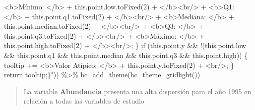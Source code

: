 \documentclass[
  10pt,
  letterpaper,
  DIV=11,
  numbers=noendperiod]{scrreprt}
\newenvironment{Shaded}{\begin{snugshade}}{\end{snugshade}}
\newcommand{\FunctionTok}[1]{\textcolor[rgb]{0.28,0.35,0.67}{#1}}
\newcommand{\NormalTok}[1]{\textcolor[rgb]{0.00,0.23,0.31}{#1}}
\newcommand{\SpecialCharTok}[1]{\textcolor[rgb]{0.37,0.37,0.37}{#1}}
\newcommand{\StringTok}[1]{\textcolor[rgb]{0.13,0.47,0.30}{#1}}
\begin{document}
\begin{Shaded}
\begin{Highlighting}[numbers=left,,]
\StringTok{                   \textquotesingle{}\textless{}b\textgreater{}Mínimo: \textless{}/b\textgreater{}\textquotesingle{} + this.point.low.toFixed(2) + \textquotesingle{}\textless{}/b\textgreater{}\textless{}br/\textgreater{}\textquotesingle{} +}
\StringTok{                   \textquotesingle{}\textless{}b\textgreater{}Q1: \textless{}/b\textgreater{}\textquotesingle{} + this.point.q1.toFixed(2) + \textquotesingle{}\textless{}/b\textgreater{}\textless{}br/\textgreater{}\textquotesingle{} +}
\StringTok{                   \textquotesingle{}\textless{}b\textgreater{}Mediana: \textless{}/b\textgreater{}\textquotesingle{} + this.point.median.toFixed(2) + \textquotesingle{}\textless{}/b\textgreater{}\textless{}br/\textgreater{}\textquotesingle{} +}
\StringTok{                   \textquotesingle{}\textless{}b\textgreater{}Q3: \textless{}/b\textgreater{}\textquotesingle{} + this.point.q3.toFixed(2) + \textquotesingle{}\textless{}/b\textgreater{}\textless{}br/\textgreater{}\textquotesingle{} +}
\StringTok{                   \textquotesingle{}\textless{}b\textgreater{}Máximo: \textless{}/b\textgreater{}\textquotesingle{} + this.point.high.toFixed(2) + \textquotesingle{}\textless{}/b\textgreater{}\textless{}br/\textgreater{}\textquotesingle{};}
\StringTok{    \}}
\StringTok{    if (this.point.y \&\& !(this.point.low \&\& this.point.q1 \&\& this.point.median \&\& this.point.q3 \&\& this.point.high)) \{ }
\StringTok{        tooltip += \textquotesingle{}\textless{}b\textgreater{}Valor Atípico: \textless{}/b\textgreater{}\textquotesingle{} + this.point.y.toFixed(2) + \textquotesingle{}\textless{}br/\textgreater{}\textquotesingle{};}
\StringTok{    \}}
\StringTok{    return tooltip;\}"}\NormalTok{)) }\SpecialCharTok{\%\textgreater{}\%} 
    \FunctionTok{hc\_add\_theme}\NormalTok{(}\FunctionTok{hc\_theme\_gridlight}\NormalTok{())}
\end{Highlighting}
\end{Shaded}

\begin{quote}
La variable \textbf{Abundancia} presenta una alta dispersión para el año
1995 en relación a todas las variables de estudio
\end{quote}
\end{document}
